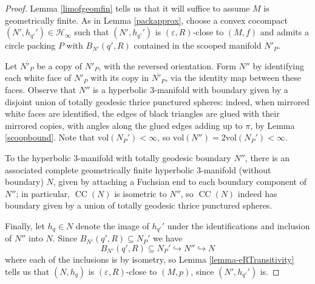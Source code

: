 \documentclass[10pt,a4paper]{amsart}
\DeclareMathOperator{\CC}{CC}
\begin{document}
\begin{proof}
    Lemma \ref{limofgeomfin} tells us that it will suffice to assume $M$ is geometrically finite. As in Lemma \ref{packapprox}, choose a convex cocompact $(N',h_{q'}')\in\mathcal{H}_\infty$ such that $(N',h_{q'}')$ is $(\varepsilon,R)$-close to $(M,f)$ and admits a circle packing $P$ with $B_{N'}(q',R)$ contained in the scooped manifold $N'_{P}$. \par

    Let $\overline{N'_P}$ be a copy of $N'_P$, with the reversed orientation. Form $N''$ by identifying each white face of $N'_P$ with its copy in $\overline{N'_P}$, via the identity map between these faces. Observe that $N''$ is a hyperbolic $3$-manifold with boundary given by a disjoint union of totally geodesic thrice punctured spheres: indeed, when mirrored white faces are identified, the edges of  black triangles are glued with their mirrored copies, with angles along the glued edges adding up to $\pi$, by Lemma \ref{scoopbound}. Note that $\mathrm{vol}(N_P')<\infty$, so $\mathrm{vol}(N'')=2\mathrm{vol}(N_P')<\infty$. \par

    To the hyperbolic $3$-manifold with totally geodesic boundary $N''$, there is an associated complete geometrically finite hyperbolic $3$-manifold (without boundary) $N$, given by attaching a Fuchsian end to each boundary component of $N''$; in particular, $\CC(N)$ is isometric to $N''$, so $\CC(N)$ indeed has boundary given by a union of totally geodesic thrice punctured spheres.\par

    Finally, let $h_q\in N$ denote the image of $h_{q'}'$ under the identifications and inclusion of $N''$ into $N$. Since $B_{N'}(q',R)\subseteq N_P'$ we have \[B_{N'}(q',R)\subseteq N_P'\hookrightarrow N''\hookrightarrow N\] where each of the inclusions is by isometry, so Lemma \ref{lemma-eRTransitivity} tells us that $(N,h_q)$ is $(\varepsilon,R)$-close to $(M,p)$, since $(N',h_{q'}')$ is.
\end{proof}
\end{document}
